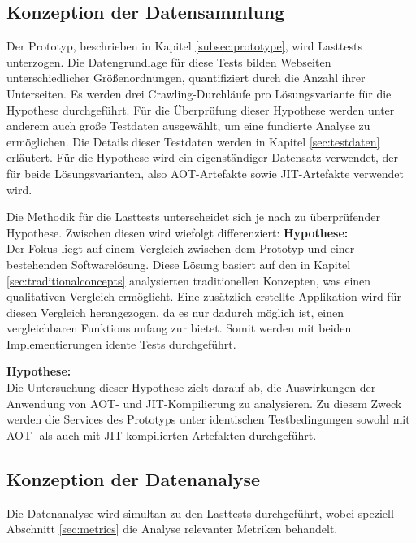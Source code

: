 \subsection{Konzeption der Datensammlung} \label{subsec:datacollection}
Der Prototyp, beschrieben in Kapitel \ref{subsec:prototype}, wird Lasttests unterzogen. Die Datengrundlage für diese Tests bilden Webseiten unterschiedlicher Größenordnungen, quantifiziert durch die Anzahl ihrer Unterseiten. Es werden drei Crawling-Durchläufe pro Lösungsvariante für die Hypothese \textit{} durchgeführt. Für die Überprüfung dieser Hypothese werden unter anderem auch große Testdaten ausgewählt, um eine fundierte Analyse zu ermöglichen. Die Details dieser Testdaten werden in Kapitel \ref{sec:testdaten} erläutert. Für die Hypothese \textit{} wird ein eigenständiger Datensatz verwendet, der für beide Lösungsvarianten, also \ac{AOT}-Artefakte sowie \ac{JIT}-Artefakte verwendet wird.

Die Methodik für die Lasttests unterscheidet sich je nach zu überprüfender Hypothese. Zwischen diesen wird wiefolgt differenziert:
\newpage
\textbf{Hypothese: }\\
Der Fokus liegt auf einem Vergleich zwischen dem Prototyp und einer bestehenden Softwarelösung. Diese Lösung basiert auf den in Kapitel \ref{sec:traditionalconcepts} analysierten traditionellen Konzepten, was einen qualitativen Vergleich ermöglicht. Eine zusätzlich erstellte Applikation wird für diesen Vergleich herangezogen, da es nur dadurch möglich ist, einen vergleichbaren Funktionsumfang zur bietet. Somit werden mit beiden Implementierungen idente Tests durchgeführt.

\textbf{Hypothese: }\\
Die Untersuchung dieser Hypothese zielt darauf ab, die Auswirkungen der Anwendung von \ac{AOT}- und \ac{JIT}-Kompilierung zu analysieren. Zu diesem Zweck werden die Services des Prototyps unter identischen Testbedingungen sowohl mit \ac{AOT}- als auch mit \ac{JIT}-kompilierten Artefakten durchgeführt. 

\subsection{Konzeption der Datenanalyse} \label{subsec:dataanalysis}
Die Datenanalyse wird simultan zu den Lasttests durchgeführt, wobei speziell Abschnitt \ref{sec:metrics} die Analyse relevanter Metriken behandelt.

